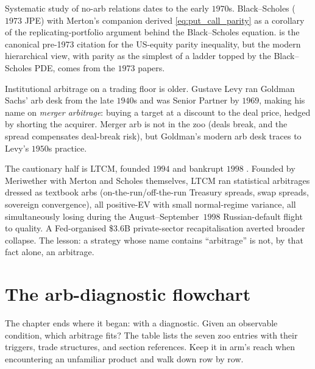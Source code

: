 \begin{historybox}
Systematic study of no-arb relations dates to the early
$1970$s. Black--Scholes ($1973$ JPE) with Merton's companion
\citep{merton1973rational} derived \eqref{eq:put_call_parity}
as a corollary of the replicating-portfolio argument behind the
Black--Scholes equation. \citet{stoll1969relationship} is the
canonical pre-1973 citation for the US-equity parity
inequality, but the modern hierarchical view, with parity as the
simplest of a ladder topped by the Black--Scholes PDE, comes
from the $1973$ papers.

Institutional arbitrage on a trading floor is older. Gustave
Levy ran Goldman Sachs' arb desk from the late $1940$s and was
Senior Partner by $1969$, making his name on \emph{merger
arbitrage}: buying a target at a discount to the deal price,
hedged by shorting the acquirer. Merger arb is not in the zoo
(deals break, and the spread compensates deal-break risk),
but Goldman's modern arb desk traces to Levy's $1950$s practice.

The cautionary half is LTCM, founded $1994$ and bankrupt
$1998$ \citep{lowenstein2000ltcm}. Founded by Meriwether with
Merton and Scholes themselves, LTCM ran statistical arbitrages
dressed as textbook arbs (on-the-run/off-the-run Treasury
spreads, swap spreads, sovereign convergence), all
positive-EV with small normal-regime variance, all
simultaneously losing during the August--September~$1998$
Russian-default flight to quality. A Fed-organised \$$3.6$B
private-sector recapitalisation averted broader collapse. The
lesson: a strategy whose name contains ``arbitrage'' is not, by
that fact alone, an arbitrage.
\end{historybox}

\section{The arb-diagnostic flowchart}
\label{sec:ch13_flowchart}

The chapter ends where it began: with a diagnostic. Given an
observable condition, which arbitrage fits? The table lists the
seven zoo entries with their triggers, trade structures, and
section references. Keep it in arm's reach when encountering an
unfamiliar product and walk down row by row.

